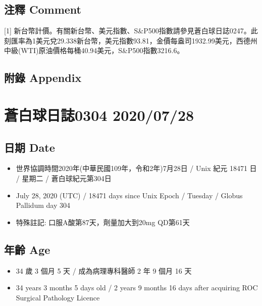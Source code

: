 \documentclass[a5paper, 11pt
]{book}
\providecommand{\tightlist}{%
  \setlength{\itemsep}{0pt}\setlength{\parskip}{0pt}}
\begin{document}
\hypertarget{ux6ce8ux91cb-comment-49}{%
\subsection{注釋 Comment}\label{ux6ce8ux91cb-comment-49}}

{[}1{]}
新台幣計價。有關新台幣、美元指數、S\&P500指數請參見蒼白球日誌0247。此刻匯率為1美元兌29.338新台幣，美元指數93.81，金價每盎司1932.99美元，西德州中級(WTI)原油價格每桶40.94美元，S\&P500指數3216.6。

\hypertarget{ux9644ux9304-appendix-49}{%
\subsection{附錄 Appendix}\label{ux9644ux9304-appendix-49}}

\hypertarget{ux84bcux767dux7403ux65e5ux8a8c0304-20200728}{%
\section{蒼白球日誌0304
2020/07/28}\label{ux84bcux767dux7403ux65e5ux8a8c0304-20200728}}

\hypertarget{ux65e5ux671f-date-50}{%
\subsection{日期 Date}\label{ux65e5ux671f-date-50}}

\begin{itemize}
\tightlist
\item
  世界協調時間2020年(中華民國109年，令和2年)7月28日 / Unix 紀元 18471 日
  / 星期二 / 蒼白球紀元第304日
\item
  July 28, 2020 (UTC) / 18471 days since Unix Epoch / Tuesday / Globus
  Pallidum day 304
\item
  特殊註記: 口服A酸第87天，劑量加大到20mg QD第61天
\end{itemize}

\hypertarget{ux5e74ux9f61-age-50}{%
\subsection{年齡 Age}\label{ux5e74ux9f61-age-50}}

\begin{itemize}
\tightlist
\item
  34 歲 3 個月 5 天 / 成為病理專科醫師 2 年 9 個月 16 天
\item
  34 years 3 months 5 days old / 2 years 9 months 16 days after
  acquiring ROC Surgical Pathology Licence
\end{itemize}
\end{document}
